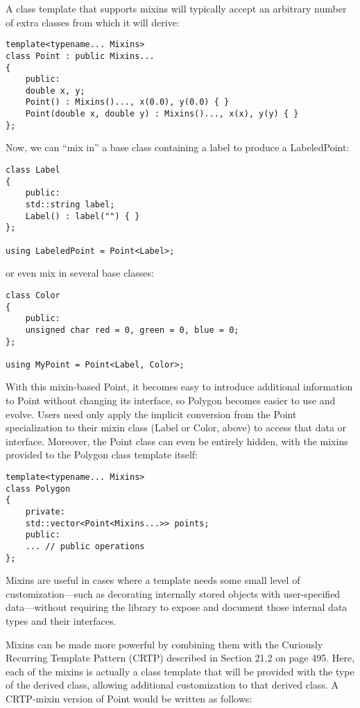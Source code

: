 A class template that supports mixins will typically accept an arbitrary number of extra classes from which it will derive:

\begin{lstlisting}[style=styleCXX]
template<typename... Mixins>
class Point : public Mixins...
{
	public:
	double x, y;
	Point() : Mixins()..., x(0.0), y(0.0) { }
	Point(double x, double y) : Mixins()..., x(x), y(y) { }
};
\end{lstlisting}

Now, we can “mix in” a base class containing a label to produce a LabeledPoint:

\begin{lstlisting}[style=styleCXX]
class Label
{
	public:
	std::string label;
	Label() : label("") { }
};

using LabeledPoint = Point<Label>;
\end{lstlisting}

or even mix in several base classes:

\begin{lstlisting}[style=styleCXX]
class Color
{
	public:
	unsigned char red = 0, green = 0, blue = 0;
};

using MyPoint = Point<Label, Color>;
\end{lstlisting}

With this mixin-based Point, it becomes easy to introduce additional information to Point without changing its interface, so Polygon becomes easier to use and evolve. Users need only apply the implicit conversion from the Point specialization to their mixin class (Label or Color, above) to access that data or interface. Moreover, the Point class can even be entirely hidden, with the mixins provided to the Polygon class template itself:

\begin{lstlisting}[style=styleCXX]
template<typename... Mixins>
class Polygon
{
	private:
	std::vector<Point<Mixins...>> points;
	public:
	... // public operations
};
\end{lstlisting}

Mixins are useful in cases where a template needs some small level of customization—such as decorating internally stored objects with user-specified data—without requiring the library to expose and document those internal data types and their interfaces.


Mixins can be made more powerful by combining them with the Curiously Recurring Template Pattern (CRTP) described in Section 21.2 on page 495. Here, each of the mixins is actually a class template that will be provided with the type of the derived class, allowing additional customization to that derived class. A CRTP-mixin version of Point would be written as follows:

